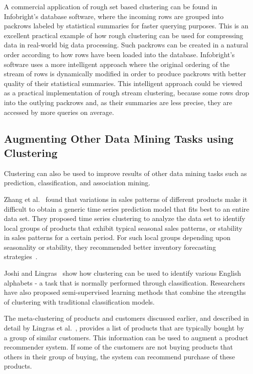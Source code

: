 \documentclass[oribibl]{llncs}
\begin{document}
A commercial application of rough set based clustering can be found in Infobright's database software, where the incoming rows are grouped into packrows labeled by statistical summaries for faster querying purposes. This is an excellent practical example of how rough clustering can be used for compressing data in real-world big data processing. Such packrows can be created in a natural order according to how rows have been loaded into the database. Infobright's software uses a more intelligent approach where the original ordering of the stream of rows is dynamically modified in order to produce packrows with better quality of their statistical summaries. This intelligent approach could be viewed as a practical implementation of rough stream clustering, because some rows drop into the outlying packrows and, as their summaries are less precise, they are accessed by more queries on average. 

\newpage
\subsection{Augmenting Other Data Mining Tasks using Clustering}

Clustering can also be used to improve results of other data mining tasks such as
prediction, classification, and association mining. 

Zhang et al.~\cite{zhang2011use} found that variations in sales patterns of different
products make it difficult to obtain
a generic time series prediction model that fits best to an entire data
set. They proposed time series
clustering to analyze the data set to identify local groups of
products that exhibit typical seasonal sales patterns, or stability in
sales patterns for a certain period.
For such local groups depending upon seasonality or stability, they
recommended better inventory forecasting strategies~\cite{zhang2011use}.

Joshi and Lingras~\cite{JoshiLingras2009} show how clustering can be used to identify various English alphabets -
a task that is normally performed through classification. Researchers have also proposed semi-supervised learning methods that combine the strengths of clustering with traditional classification models.

The meta-clustering of products and customers discussed earlier, and described in detail by Lingras et al.~\cite{Lingras2013}, provides a list of products that are typically bought by a group of similar customers. This information can be used to augment a product recommender system. If some of the customers are not buying products that others in their group of buying, the system can recommend purchase of these products.
\end{document}
